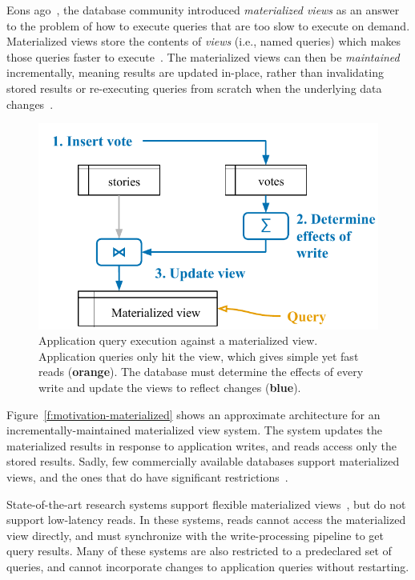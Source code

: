 
Eons ago~\cite{relational-materialized-views,stonebraker-views}, the database
community introduced \textit{materialized views} as an answer to the problem of
how to execute queries that are too slow to execute on demand. Materialized
views store the contents of \textit{views} (i.e., named queries) which makes
those queries faster to execute~\cite{materialized-views}. The materialized
views can then be \textit{maintained} incrementally, meaning results are updated
in-place, rather than invalidating stored results or re-executing queries from
scratch when the underlying data changes~\cite{materialized-survey}.

\begin{figure}[h]
  \centering
  \includegraphics{diagrams/Motivation Materialized Views.pdf}
  \caption{Application query execution against a materialized view. Application
  queries only hit the view, which gives simple yet fast reads
  (\textbf{\color{set2}orange}). The database must determine the effects of
  every write and update the views to reflect changes
  (\textbf{\color{set1}blue}).}
  \label{f:motivation-materialized}
\end{figure}

Figure~\vref{f:motivation-materialized} shows an approximate architecture for an
incrementally-maintained materialized view system. The system updates the
materialized results in response to application writes, and reads access only
the stored results. Sadly, few commercially available databases support
materialized views, and the ones that do have significant
restrictions~\cite{mssql-materialized-view-restrictions}.

State-of-the-art research systems support flexible materialized
views~\cite{dbtoaster,materialize}, but do not support low-latency reads. In
these systems, reads cannot access the materialized view directly, and must
synchronize with the write-processing pipeline to get query results. Many of
these systems are also restricted to a predeclared set of queries, and cannot
incorporate changes to application queries without restarting.

